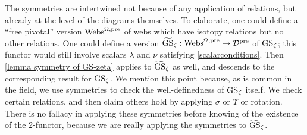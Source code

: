 \begin{remark} The symmetries are intertwined not because of any application of relations, but already at the level of the diagrams themselves. 
To elaborate, one could define a ``free pivotal'' version $\operatorname{Webs}^{\Omega, \operatorname{pre}}$ of webs which have isotopy relations but no other relations. 
One could define a version $\widetilde{\operatorname{GS}}_{\zeta}: \operatorname{Webs}^{\Omega, \operatorname{pre}} \rightarrow \mathcal{D}^{\operatorname{pre}}$ of $\operatorname{GS}_{\zeta}$; this functor would still involve scalars $\lambda$ and $\nu$ satisfying \eqref{scalarconditions}. 
Then \cref{lemma symmetry of GS-zeta} applies to $\widetilde{\operatorname{GS}}_{\zeta}$ as well, and descends to the corresponding result for $\operatorname{GS}_{\zeta}$. We mention this point because, as is common in the field, we use symmetries to check the well-definedness of $\operatorname{GS}_{\zeta}$ itself. We check certain relations, and then claim others hold by applying $\sigma$ or $\Upsilon$ or rotation. There is no fallacy in applying these symmetries before knowing of the existence of the $2$-functor, because we are really applying the symmetries to $\widetilde{\operatorname{GS}}_{\zeta}$. \end{remark}


